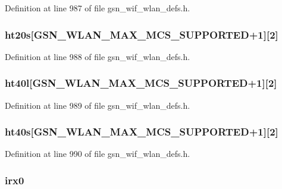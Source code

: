 Definition at line 987 of file gsn\_\-wif\_\-wlan\_\-defs.h.

\hypertarget{a00398_ac3156ecb8d65f7e4aac2caf45fff0d1a}{
\subsubsection[{ht20s}]{ {\bf ht20s}\mbox{[}GSN\_\-WLAN\_\-MAX\_\-MCS\_\-SUPPORTED+1\mbox{]}\mbox{[}2\mbox{]}}}
\label{a00398_ac3156ecb8d65f7e4aac2caf45fff0d1a}


Definition at line 988 of file gsn\_\-wif\_\-wlan\_\-defs.h.

\hypertarget{a00398_ab42c2405c4fac47ff38d981b9ebcb346}{
\subsubsection[{ht40l}]{ {\bf ht40l}\mbox{[}GSN\_\-WLAN\_\-MAX\_\-MCS\_\-SUPPORTED+1\mbox{]}\mbox{[}2\mbox{]}}}
\label{a00398_ab42c2405c4fac47ff38d981b9ebcb346}


Definition at line 989 of file gsn\_\-wif\_\-wlan\_\-defs.h.

\hypertarget{a00398_abb9b5107f666672351985f8fc94b7f54}{
\subsubsection[{ht40s}]{ {\bf ht40s}\mbox{[}GSN\_\-WLAN\_\-MAX\_\-MCS\_\-SUPPORTED+1\mbox{]}\mbox{[}2\mbox{]}}}
\label{a00398_abb9b5107f666672351985f8fc94b7f54}


Definition at line 990 of file gsn\_\-wif\_\-wlan\_\-defs.h.

\hypertarget{a00398_adc1f5ab02d021844e0e445e777944e1c}{
\subsubsection[{irx0}]{ {\bf irx0}}}
\label{a00398_adc1f5ab02d021844e0e445e777944e1c}


